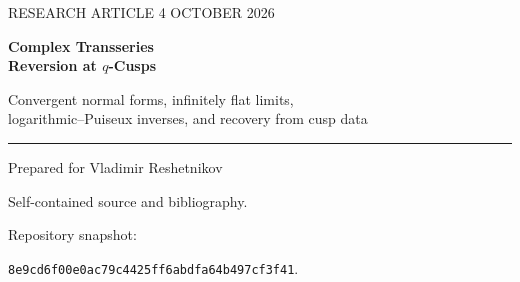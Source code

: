 \documentclass[11pt,a4paper]{article}
\numberwithin{equation}{section}
\theoremstyle{definition}\newtheorem{definition}[theorem]{Definition}
\theoremstyle{remark}\newtheorem{remark}[theorem]{Remark}
\begin{document}
\hypersetup{pageanchor=false}
\begin{titlepage}
\vspace*{13mm}
{\color{accent}\large RESEARCH ARTICLE \hfill 4 OCTOBER 2026}\par
\vspace{16mm}
{\color{ink}\Huge\bfseries Complex Transseries\\[4pt] Reversion at $q$-Cusps}\par
\vspace{8mm}
{\Large Convergent normal forms, infinitely flat limits,\\[3pt]
logarithmic--Puiseux inverses, and recovery from cusp data}\par
\vspace{12mm}\hrule\vspace{7mm}
{\large Prepared for Vladimir Reshetnikov}\par
\vspace{9mm}
\begin{abstract}
We develop a branch-resolved inversion calculus for complex transseries and
apply it to $q$-products at rational boundary points. The analytic core is a
convergent, multivariable implicit-function construction for
$Y=Ct^\beta\e^{-A/t}U(t,\e^{-B_1/t},\ldots,\e^{-B_d/t})$.
It retains complete exponential sectors, gives explicit coefficient
extraction and residual bounds, and converts ratios of actions into powers
of the inverse variable. A second scaling handles power and regular cores
whose exponentially small perturbations have large logarithmic derivatives.

For every finite Euler-product quotient
$\prod_{\delta\mid N}(q^\delta;q^\delta)_\infty^{r_\delta}$,
we derive an exact analytic normal form at every root of unity. Three
explicit linear invariants determine the inverse regime. When all three
vanish, the quotient has a nonconstant but infinitely flat finite limit;
its inverse is described by a convergent Puiseux series inside a logarithmic
denominator. We prove a four-factor minimum at $q=1$ and realize every finite correction
ramification degree with four factors. We compute two examples and recover every exponent $r_\delta$ from the leading
exponential data at divisor cusps by a double M\"obius inversion. Additional
results treat nonmodular shifted factorials, finite Gaussian multinomials,
and the transport of sectorial jumps through inversion.

All stated local theorems have conventional proofs. Classical modular,
Lagrange, and resurgent-closure results are attributed; the proposed
contribution is their explicit branch-aware synthesis and the accompanying
classification and reconstruction formulas. Worldwide novelty is not
established. The included computations are reproducible checks, not
proof-assistant or interval certificates.
\end{abstract}
\vfill
{\small\color{ink}Self-contained source and bibliography.\par Repository snapshot:\par
\texttt{8e9cd6f00e0ac79c4425ff6abdfa64b497cf3f41}.}
\end{titlepage}
\hypersetup{pageanchor=true}\setcounter{page}{1}
\begingroup\small\setlength{\parskip}{0pt}
\tableofcontents
\endgroup\newpage
\end{document}
